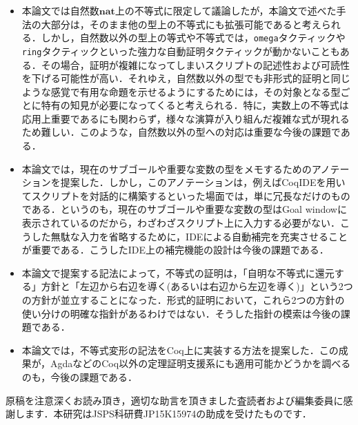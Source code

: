 \documentclass[submit]{ipsj}
\begin{document}
\begin{itemize}
\item 本論文では自然数$\mathbf{nat}$上の不等式に限定して議論したが，本論文で述べた手法の大部分は，そのまま他の型上の不等式にも拡張可能であると考えられる．しかし，自然数以外の型上の等式や不等式では，\verb~omega~タクティックや\verb~ring~タクティックといった強力な自動証明タクティックが動かないこともある．その場合，証明が複雑になってしまいスクリプトの記述性および可読性を下げる可能性が高い．それゆえ，自然数以外の型でも非形式的証明と同じような感覚で有用な命題を示せるようにするためには，その対象となる型ごとに特有の知見が必要になってくると考えられる．特に，実数上の不等式は応用上重要であるにも関わらず，様々な演算が入り組んだ複雑な式が現れるため難しい．このような，自然数以外の型への対応は重要な今後の課題である．
\item 本論文では，現在のサブゴールや重要な変数の型をメモするためのアノテーションを提案した．しかし，このアノテーションは，例えばCoqIDEを用いてスクリプトを対話的に構築するといった場面では，単に冗長なだけのものである．というのも，現在のサブゴールや重要な変数の型はGoal windowに表示されているのだから，わざわざスクリプト上に入力する必要がない．こうした無駄な入力を省略するために，IDEによる自動補完を充実させることが重要である．こうしたIDE上の補完機能の設計は今後の課題である．
\item 本論文で提案する記法によって，不等式の証明は，「自明な不等式に還元する」方針と「左辺から右辺を導く(あるいは右辺から左辺を導く)」という2つの方針が並立することになった．形式的証明において，これら2つの方針の使い分けの明確な指針があるわけではない．そうした指針の模索は今後の課題である．
\item 本論文では，不等式変形の記法をCoq上に実装する方法を提案した．この成果が，AgdaなどのCoq以外の定理証明支援系にも適用可能かどうかを調べるのも，今後の課題である．
\end{itemize}

\begin{acknowledgment}
原稿を注意深くお読み頂き，適切な助言を頂きました査読者および編集委員に感謝します．本研究はJSPS科研費JP15K15974の助成を受けたものです．
\end{acknowledgment}




\begin{biography}

\end{biography}
\end{document}
